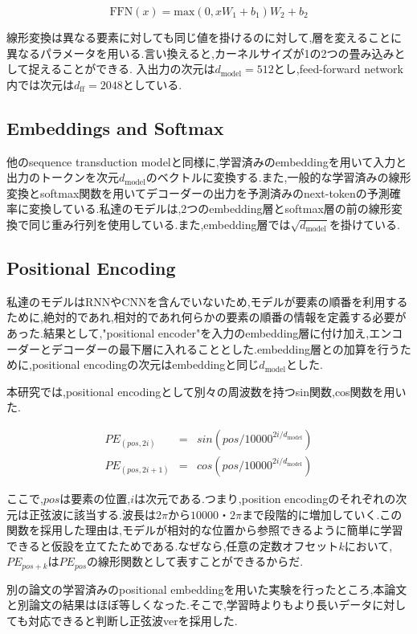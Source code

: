 \documentclass[twocolumn]{jarticle}     %
\begin{document}
\begin{equation}
  \mathrm{FFN}(x) = \mathrm{max}(0,xW_\mathrm{1}+b_\mathrm{1})W_\mathrm{2} + b_\mathrm{2}
\end{equation}

線形変換は異なる要素に対しても同じ値を掛けるのに対して,層を変えることに異なるパラメータを用いる.言い換えると,カーネルサイズが1の2つの畳み込みとして捉えることができる.
入出力の次元は$d_\mathrm{model} = 512$とし,feed-forward network内では次元は$d_\mathrm{ff} = 2048$としている.

\subsection{Embeddings and Softmax}
他のsequence transduction modelと同様に,学習済みのembeddingを用いて入力と出力のトークンを次元$d_\mathrm{model}$のベクトルに変換する.また,一般的な学習済みの線形変換とsoftmax関数を用いてデコーダーの出力を予測済みのnext-tokenの予測確率に変換している.私達のモデルは,2つのembedding層とsoftmax層の前の線形変換で同じ重み行列を使用している.また,embedding層では$\sqrt{d_\mathrm{model}}$を掛けている.

\subsection{Positional Encoding}
私達のモデルはRNNやCNNを含んでいないため,モデルが要素の順番を利用するために,絶対的であれ,相対的であれ何らかの要素の順番の情報を定義する必要があった.結果として,"positional encoder"を入力のembedding層に付け加え,エンコーダーとデコーダーの最下層に入れることとした.embedding層との加算を行うために,positional encodingの次元はembeddingと同じ$d_\mathrm{model}$とした.\par
本研究では,positional encodingとして別々の周波数を持つsin関数,cos関数を用いた.

\begin{eqnarray*}
  PE_{(pos,2i)} &= &sin(pos/10000^{2i/d_\mathrm{model}}) \\
  PE_{(pos,2i+1)} &= &cos(pos/10000^{2i/d_\mathrm{model}})
\end{eqnarray*}

ここで,$pos$は要素の位置,$i$は次元である.つまり,position encodingのそれぞれの次元は正弦波に該当する.波長は$2\pi$から$10000・2\pi$まで段階的に増加していく.この関数を採用した理由は,モデルが相対的な位置から参照できるように簡単に学習できると仮設を立てたためである.なぜなら,任意の定数オフセット$k$において,$PE_{pos+k}$は$PE_{pos}$の線形関数として表すことができるからだ.\par
別の論文の学習済みのpositional embeddingを用いた実験を行ったところ,本論文と別論文の結果はほぼ等しくなった.そこで,学習時よりもより長いデータに対しても対応できると判断し正弦波verを採用した.
\end{document}
